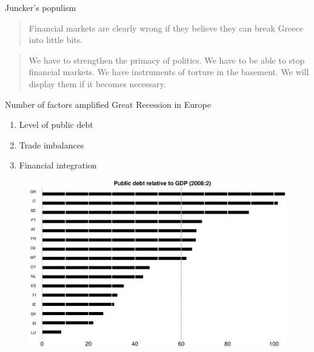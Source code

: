 \documentclass{beamer}
\begin{document}
\begin{frame}
  Juncker's populism
  \begin{quote}
    Financial markets are clearly wrong if they believe they can break Greece into little bits.
  \end{quote}
  \begin{quote}
    We have to strengthen the primacy of politics. We have to be able to stop financial markets. We have instruments of torture in the basement. We will display them if it becomes necessary.
  \end{quote}
\end{frame}

\begin{frame}
  Number of factors amplified Great Recession in Europe
  \begin{enumerate}
    \item Level of public debt
    \item Trade imbalances
    \item Financial integration
  \end{enumerate}
\end{frame}

\begin{frame}
  \begin{figure}
    \includegraphics[scale=.3]{public_debt_eurozone2.eps}
  \end{figure}
\end{frame}
\end{document}
